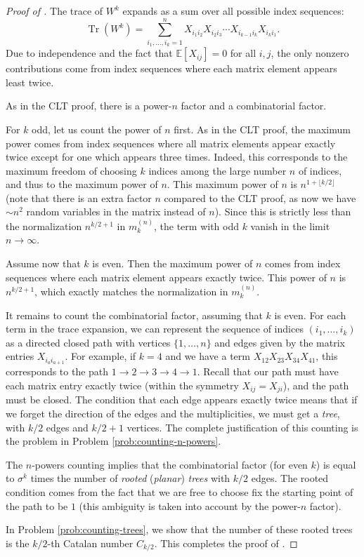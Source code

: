 \documentclass[letterpaper,11pt,oneside,reqno]{article}
\numberwithin{equation}{section}
\theoremstyle{definition}
\begin{document}
\begin{proof}[Proof of ]
	The trace of $W^k$ expands as a sum over all possible index sequences:
	\begin{equation}
		\operatorname{Tr}(W^k) = \sum_{i_1,\ldots,i_k=1}^n X_{i_1i_2}X_{i_2i_3}\cdots X_{i_{k-1}i_k}X_{i_ki_1}.
	\end{equation}
	Due to independence and the fact that
	$\mathbb{E}[X_{ij}]=0$ for all $i,j$, the only nonzero
	contributions come from index sequences
	where each matrix element appears least twice.

	As in the CLT proof, there is a power-$n$ factor and a combinatorial factor.

	For $k$ odd, let us count the power of $n$ first. As
	in the CLT proof, the
	maximum power comes from index sequences where all matrix
	elements appear exactly twice except for one which appears
	three times. Indeed, this corresponds to the maximum
	freedom of choosing $k$ indices among the large number $n$
	of indices, and thus to the maximum power of $n$.
	This maximum power of $n$ is $n^{1+\lfloor k/2 \rfloor }$
	(note that there is an extra factor $n$ compared to the CLT proof,
	as now we have $\sim n^2$ random variables in the matrix instead of $n$).
	Since this is strictly less than the
	normalization $n^{k/2+1}$ in $m_k^{(n)}$, the term with odd $k$
	vanish in the limit $n\to\infty$.

	Assume now that $k$ is even.
	Then the maximum power of $n$ comes from index sequences where each matrix element appears exactly twice.
	This power of $n$ is $n^{k/2+1}$, which exactly
	matches the normalization in $m_k^{(n)}$.

	It remains to count the combinatorial factor,
	assuming that $k$ is even.
	For each term in the trace expansion, we can represent the sequence of indices $(i_1,\ldots,i_k)$ as a directed closed path with vertices $\{1,\ldots,n\}$ and edges given by the matrix entries $X_{i_ai_{a+1}}$. For example, if $k=4$ and we have a term $X_{12}X_{23}X_{34}X_{41}$, this corresponds to the path $1\to 2\to 3\to 4\to 1$. Recall that our path must have each
	matrix entry exactly twice (within the symmetry $X_{ij}=X_{ji}$),
	and the path must be closed.
	The condition that each edge appears exactly twice
	means that if we forget the direction of the edges and the multiplicities,
	we must get a \emph{tree}, with $k/2$ edges and $k/2+1$ vertices.
	The complete justification of this counting is the
	problem in Problem \ref{prob:counting-n-powers}.

	The $n$-powers counting implies that the combinatorial
	factor (for even $k$)
	is equal to $\sigma^k$ times the
	number of \emph{rooted} (\emph{planar}) \emph{trees} with $k/2$ edges.
	The rooted condition comes from the fact that
	we are free to choose fix the starting point of the path
	to be $1$ (this ambiguity is taken into account by the
	power-$n$ factor).

	In Problem \ref{prob:counting-trees}, we show that the number of these rooted trees is the $k/2$-th Catalan number $C_{k/2}$.
	This completes the proof of .
\end{proof}
\end{document}
